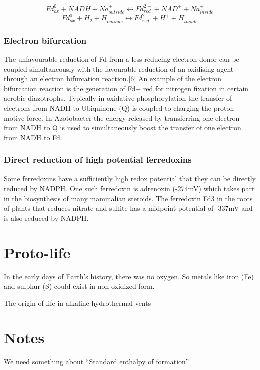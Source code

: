 \documentclass[a4paper,14pt]{extarticle}
\begin{document}
\[
    Fd_{ox}^0 + NADH + Na_{outside}^+ \leftrightarrow Fd_{red}^{2-} + NAD^+ + Na_{inside}^+
\]
\[
    Fd_{ox}^0 + H_2 + H_{outside}^+ \leftrightarrow Fd_{red}^{2-} + H^+ + H_{inside}^+
\]

\subsubsection{Electron bifurcation}
The unfavourable reduction of Fd from a less reducing electron donor can be coupled
simultaneously with the favourable reduction of an oxidising agent through an electron
bifurcation reaction.[6] An example of the electron bifurcation reaction is the generation
of Fd− red for nitrogen fixation in certain aerobic diazotrophs. Typically in oxidative
phosphorylation the transfer of electrons from NADH to Ubiquinone (Q) is coupled to
charging the proton motive force. In Azotobacter the energy released by transferring one
electron from NADH to Q is used to simultaneously boost the transfer of one electron from
NADH to Fd.

\subsubsection{Direct reduction of high potential ferredoxins}
Some ferredoxins have a sufficiently high redox potential that they can be directly
reduced by NADPH\@. One such ferredoxin is adrenoxin (-274mV) which takes part in the
biosynthesis of many mammalian steroids.  The ferredoxin Fd3 in the roots of plants that
reduces nitrate and sulfite has a midpoint potential of -337mV and is also reduced by
NADPH\@.

\section{Proto-life}
In the early days of Earth's history, there was no oxygen. So metals like iron (Fe) and
sulphur (S) could exist in non-oxidized form.

The origin of life in alkaline hydrothermal vents


\pagebreak
\section{Notes}\label{sec_notes}

We need something about ``Standard enthalpy of formation''.
\end{document}
